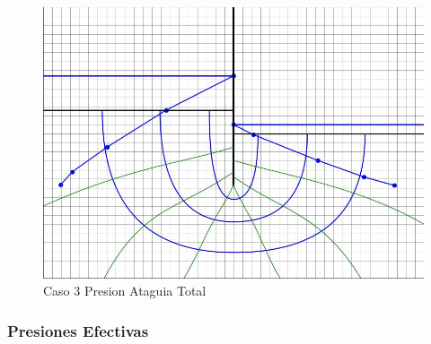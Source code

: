 \begin{figure}[H]
\begin{minipage}{0.32\textwidth}
        \includegraphics[width=\textwidth]{GRAFICOS/caso_3_presion_ataguia_total.jpg}
        \caption{Caso 3 Presion Ataguia Total}
    \end{minipage}
\end{figure}

\subsubsection{Presiones Efectivas}

